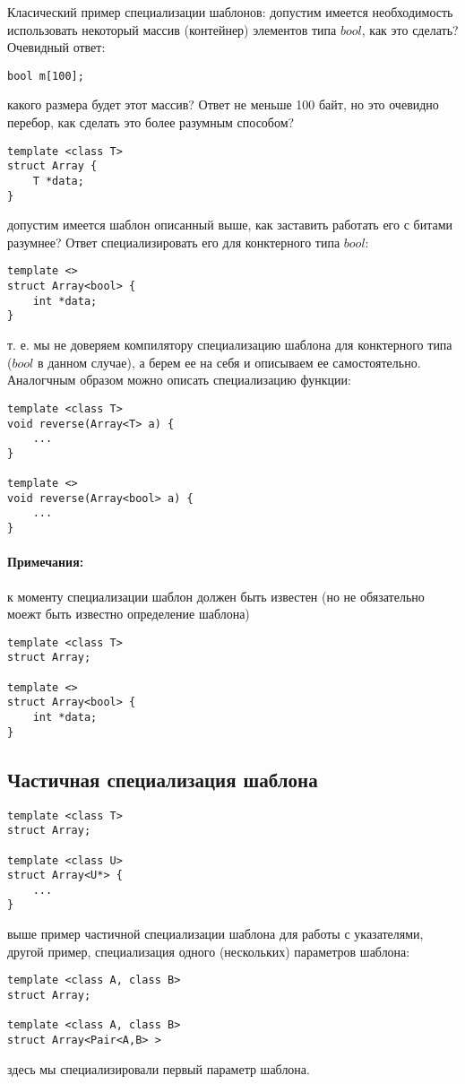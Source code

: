Класический пример специализации шаблонов: допустим имеется необходимость использовать некоторый массив (контейнер) элементов типа $bool$, как это сделать?
Очевидный ответ:
\begin{lstlisting}
bool m[100];
\end{lstlisting}
какого размера будет этот массив? Ответ не меньше 100 байт, но это очевидно перебор, как сделать это более разумным способом?
\begin{lstlisting}
template <class T>
struct Array {
	T *data;
}
\end{lstlisting}
допустим имеется шаблон описанный выше, как заставить работать его с битами разумнее? Ответ специализировать его для конктерного типа $bool$:
\begin{lstlisting}
template <>
struct Array<bool> {
	int *data;
}
\end{lstlisting}
т. е. мы не доверяем компилятору специализацию шаблона для конктерного типа ($bool$ в данном случае), а берем ее на себя и описываем ее самостоятельно. Аналогчным
образом можно описать специализацию функции:
\begin{lstlisting}
template <class T>
void reverse(Array<T> a) {
	...
}

template <>
void reverse(Array<bool> a) {
	...
}
\end{lstlisting}

\paragraph{Примечания:} к моменту специализации шаблон должен быть известен (но не обязательно моежт быть известно определение шаблона)
\begin{lstlisting}
template <class T>
struct Array;

template <>
struct Array<bool> {
	int *data;
}
\end{lstlisting}

\subsection{Частичная специализация шаблона}

\begin{lstlisting}
template <class T>
struct Array;

template <class U>
struct Array<U*> {
	...
}
\end{lstlisting}
выше пример частичной специализации шаблона для работы с указателями, другой пример, специализация одного (нескольких) параметров шаблона:
\begin{lstlisting}
template <class A, class B>
struct Array;

template <class A, class B>
struct Array<Pair<A,B> >
\end{lstlisting}
здесь мы специализировали первый параметр шаблона.

